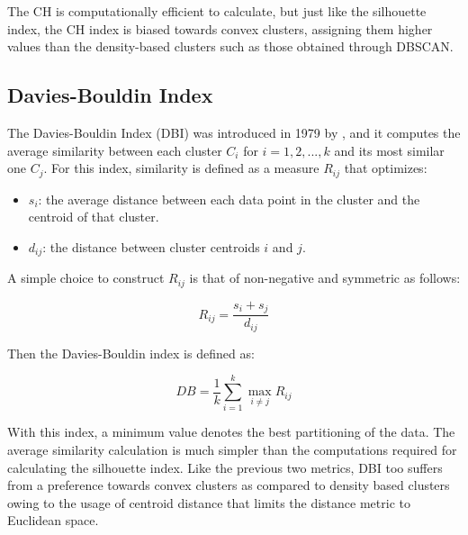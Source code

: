 

The CH is computationally efficient to calculate, but just like the silhouette index, the CH index is biased towards convex clusters, assigning them higher values than the density-based clusters such as those obtained through DBSCAN.

\subsection{Davies-Bouldin Index}

The Davies-Bouldin Index (DBI) was introduced in 1979 by \cite{4766909}, and it computes the average similarity between each cluster $C_i$ for $i = 1,2,...,k$ and its most similar one $C_j$.  For this index, similarity is defined as a measure $R_{ij}$ that optimizes:

\begin{itemize}
    \item $s_i$: the average distance between each data point in the cluster and the centroid of that cluster.
    \item $d_{ij}$: the distance between cluster centroids $i$ and $j$.
\end{itemize}

A simple choice to construct $R_{ij}$ is that of non-negative and symmetric as follows:

\begin{equation}
    R_{ij} = \frac{s_i + s_j}{d_{ij}}
\end{equation}

Then the Davies-Bouldin index is defined as:

\begin{equation}
    DB = \frac{1}{k} \sum_{i=1}^k \max_{i \neq j} R_{ij}
\end{equation}

 With this index, a minimum value denotes the best partitioning of the data. The average similarity calculation is much simpler than the computations required for calculating the silhouette index. Like the previous two metrics, DBI too suffers from a preference towards convex clusters as compared to density based clusters owing to the usage of centroid distance that limits the distance metric to Euclidean space.





